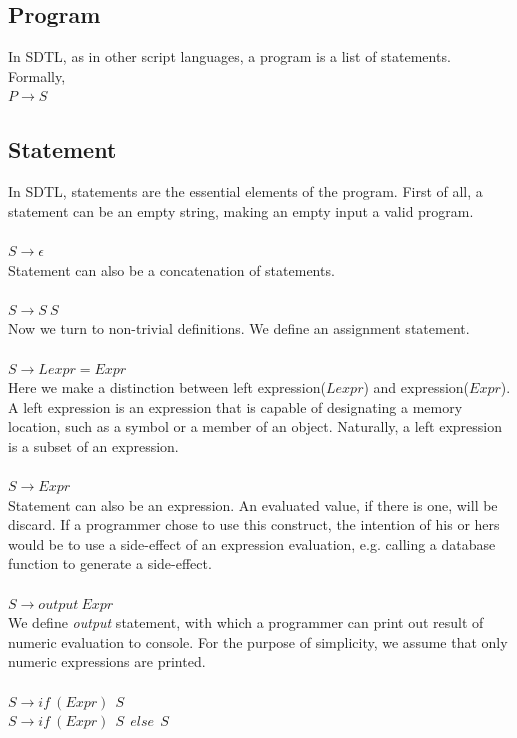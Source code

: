 \documentclass[a4paper,12pt]{article}
\begin{document}
\subsection{Program}
In SDTL, as in other script languages, a program is a list of statements. Formally,\\
$P \rightarrow S$\\

\subsection{Statement}
In SDTL, statements are the essential elements of the program. First of all, a statement can be an empty string, making an empty input a valid program.\\\\
$S \rightarrow \epsilon$\\
Statement can also be a concatenation of statements.\\\\
$S \rightarrow S\  S$\\
Now we turn to non-trivial definitions. We define an assignment statement.\\\\
$S \rightarrow Lexpr = Expr$\\
Here we make a distinction between left expression($Lexpr$) and expression($Expr$). A left expression is an expression that is capable of designating a memory location, such as a symbol or a member of an object. Naturally, a left expression is a subset of an expression.\\\\
$S \rightarrow Expr$\\
Statement can also be an expression. An evaluated value, if there is one, will be discard. If a programmer chose to use this construct, the intention of his or hers would be to use a side-effect of an expression evaluation, e.g. calling a database function to generate a side-effect.\\\\
$S \rightarrow output\  Expr$\\
We define \textit{output} statement, with which a programmer can print out result of numeric evaluation to console. For the purpose of simplicity, we assume that only numeric expressions are printed.\\\\
$S \rightarrow if\ (Expr)\ {\ S\ }$\\
$S \rightarrow if\ (Expr)\ {\ S\ }\ else\ {\ S\ }$\\
\end{document}
